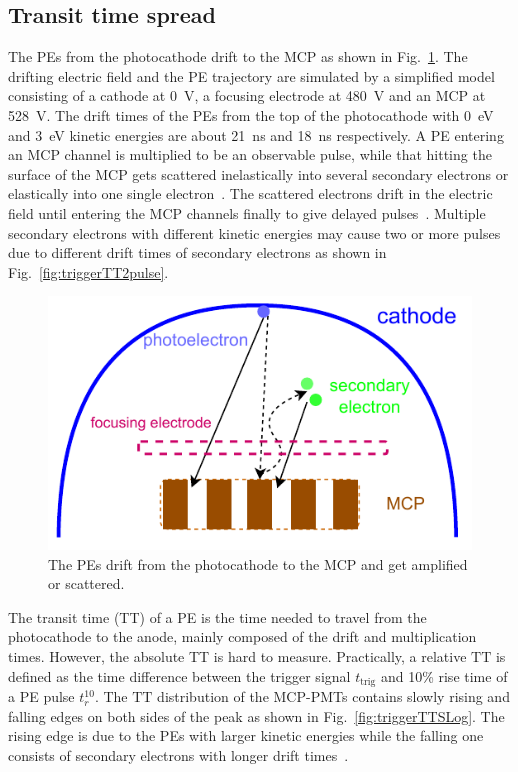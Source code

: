 \subsection{Transit time spread}
The PEs from the photocathode drift to the MCP as shown in Fig.~\ref{fig:mcpelectron}. The drifting electric field and the PE trajectory are simulated by a simplified model consisting of a cathode at \SI{0}{V}, a focusing electrode at \SI{480}{V} and an MCP at \SI{528}{V}. The drift times of the PEs from the top of the photocathode with \SI{0}{eV} and \SI{3}{eV} kinetic energies are about \SI{21}{ns} and \SI{18}{ns} respectively. A PE entering an MCP channel is multiplied to be an observable pulse, while that hitting the surface of the MCP gets scattered inelastically into several secondary electrons or elastically into one single electron~\cite{Furman}. The scattered electrons drift in the electric field until entering the MCP channels finally to give delayed pulses~\cite{KM3NetTesting}. Multiple secondary electrons with different kinetic energies may cause two or more pulses due to different drift times of secondary electrons as shown in Fig.~\ref{fig:triggerTT2pulse}.

\begin{figure}[!htbp]
    \centering
    \includegraphics[width=\MF\textwidth]{figures/method/MCPelectron.pdf}
    \caption{The PEs drift from the photocathode to the MCP and get amplified or scattered.}%
    \label{fig:mcpelectron}
\end{figure}

The transit time (TT) of a PE is the time needed to travel from the photocathode to the anode, mainly composed of the drift and multiplication times. However, the absolute TT is hard to measure. Practically, a relative $\mathrm{TT}$ is defined as the time difference between the trigger signal $t_{\mathrm{trig}}$ and 10\% rise time of a PE pulse $t_r^{10}$. The $\mathrm{TT}$ distribution of the MCP-PMTs contains slowly rising and falling edges on both sides of the peak as shown in Fig.~\ref{fig:triggerTTSLog}. The rising edge is due to the PEs with larger kinetic energies while the falling one consists of secondary electrons with longer drift times~\cite{longtail}.

